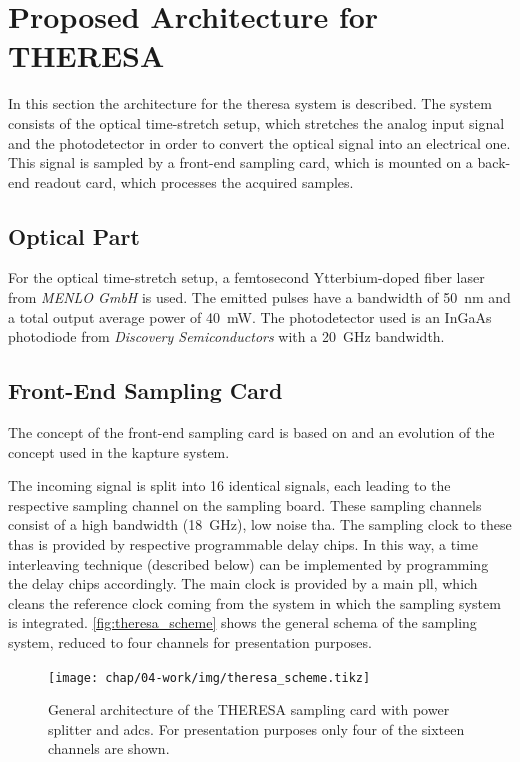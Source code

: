 \section{Proposed Architecture for THERESA}
In this section the architecture for the \gls{theresa} system is described.
The system consists of the optical time-stretch setup, which stretches the analog input signal and the photodetector in order to convert the optical signal into an electrical one.
This signal is sampled by a front-end sampling card, which is mounted on a back-end readout card, which processes the acquired samples.

\subsection*{Optical Part}
For the optical time-stretch setup, a femtosecond Ytterbium-doped fiber laser from \textit{MENLO GmbH} is used. The emitted pulses have a bandwidth of \SI{50}{\nano \meter} and a total output average power of \SI{40}{\milli \watt}.
The photodetector used is an InGaAs photodiode from \textit{Discovery Semiconductors} with a \SI{20}{\GHz} bandwidth.

\subsection{Front-End Sampling Card}
The concept of the front-end sampling card is based on and an evolution of the concept used in the \gls{kapture} system. 

The incoming signal is split into 16 identical signals, each leading to the respective sampling channel on the sampling board.
These sampling channels consist of a high bandwidth (\SI{18}{\GHz}), low noise \gls{tha}. %
The sampling clock to these \glspl{tha} is provided by respective programmable delay chips.
In this way, a time interleaving technique (described below) can be implemented by programming the delay chips accordingly. 
The main clock is provided by a main \gls{pll}, which cleans the reference clock coming from the system in which the sampling system is integrated.
\autoref{fig:theresa_scheme} shows the general schema of the sampling system, reduced to four channels for presentation purposes.
\begin{figure}[H]
	\centering
	\texttt{[image: chap/04-work/img/theresa\_scheme.tikz]}
	\caption[General architecture of the THERESA sampling card]{General architecture of the THERESA sampling card with power splitter and \glspl{adc}. For presentation purposes only four of the sixteen channels are shown.}
	\label{fig:theresa_scheme}
\end{figure}

